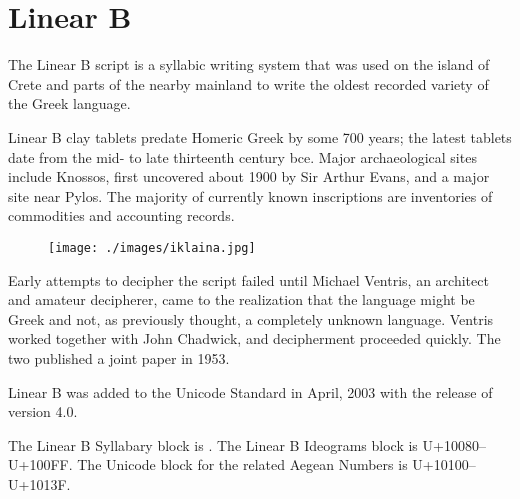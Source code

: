 
\section{Linear B}
\label{s:linearb}

The Linear B script is a syllabic writing system that was used on the island of Crete and
parts of the nearby mainland to write the oldest recorded variety of the Greek language.

Linear B clay tablets predate Homeric Greek by some 700 years; the latest tablets date from
the mid- to late thirteenth century bce. Major archaeological sites include Knossos, first
uncovered about 1900 by Sir Arthur Evans, and a major site near Pylos. The majority of
currently known inscriptions are inventories of commodities and accounting records.
\medskip

\begin{figure}[ht]
\centering
\begin{minipage}{5cm}
\texttt{[image: ./images/iklaina.jpg]}
\end{minipage}\hspace{2em}
\begin{minipage}{7cm}
\end{minipage}

\end{figure}


Early attempts to decipher the script failed until Michael Ventris, an architect and amateur
decipherer, came to the realization that the language might be Greek and not, as previously
thought, a completely unknown language. Ventris worked together with John Chadwick,
and decipherment proceeded quickly. The two published a joint paper in 1953.


\newfontfamily{}

Linear B was added to the Unicode Standard in April, 2003 with the release of version 4.0.

The Linear B Syllabary block is . The Linear B Ideograms block is {\smallcps U+10080–U+100FF}. The Unicode block for the related Aegean Numbers is U+10100–U+1013F.

